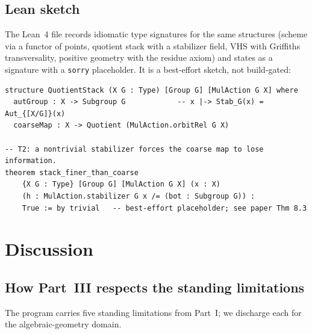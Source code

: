 \documentclass[12pt]{article}
\theoremstyle{definition}
\theoremstyle{remark}
\begin{document}
\subsection{Lean sketch}

The \textsf{Lean~4} file records idiomatic type signatures for the same structures (scheme via a functor
of points, quotient stack with a stabilizer field, VHS with Griffiths transversality, positive geometry
with the residue axiom) and states  as a signature with a \texttt{sorry} placeholder. It
is a best-effort sketch, not build-gated:
\begin{verbatim}
structure QuotientStack (X G : Type) [Group G] [MulAction G X] where
  autGroup : X -> Subgroup G            -- x |-> Stab_G(x) = Aut_{[X/G]}(x)
  coarseMap : X -> Quotient (MulAction.orbitRel G X)

-- T2: a nontrivial stabilizer forces the coarse map to lose information.
theorem stack_finer_than_coarse
    {X G : Type} [Group G] [MulAction G X] (x : X)
    (h : MulAction.stabilizer G x /= (bot : Subgroup G)) :
    True := by trivial   -- best-effort placeholder; see paper Thm 8.3
\end{verbatim}

\section{Discussion}
\label{sec:discussion}

\subsection{How Part~III respects the standing limitations}
\label{sec:limitations}

The program carries five standing limitations from Part~I; we discharge each for the
algebraic-geometry domain.
\end{document}
